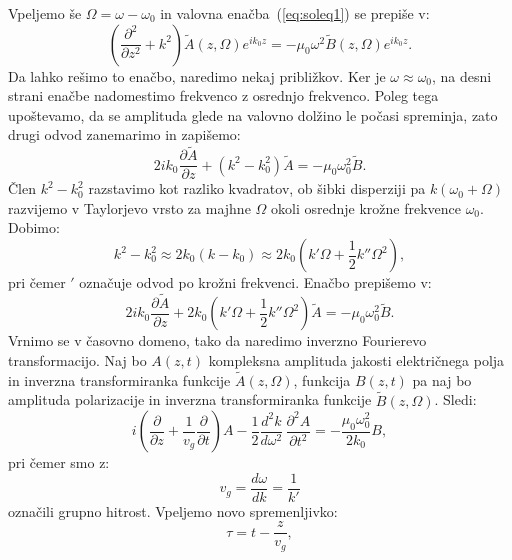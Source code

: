 Vpeljemo še 
$\Omega =\omega - \omega_0$ in valovna enačba~(\ref{eq:soleq1}) se prepiše v: 
\begin{equation}
\left(\frac{\partial^2}{\partial z^2}+k^2\right)\tilde{A}(z,\Omega) e^{ik_0z} =
- \mu_{0}\omega^2 \tilde{B} (z,\Omega) e^{ik_0z}.
\end{equation}
Da lahko rešimo to enačbo, naredimo nekaj približkov. Ker je $\omega \approx \omega_0$, na desni strani
enačbe nadomestimo frekvenco z osrednjo frekvenco. Poleg tega upoštevamo, da se amplituda 
glede na valovno dolžino le počasi spreminja, zato drugi odvod zanemarimo in zapišemo: 
\begin{equation}
2 i k_0 \frac{\partial \tilde{A}}{\partial z} + (k^2-k_0^2) \tilde{A} = - \mu_{0}\omega_0^2 \tilde{B}.
\end{equation}
Člen $k^2 - k_0^2$ razstavimo kot razliko kvadratov, ob šibki disperziji pa $k(\omega_0 + \Omega)$
razvijemo v Taylorjevo vrsto za majhne $\Omega$ 
okoli osrednje krožne frekvence $\omega_0$. Dobimo:
\begin{equation}
k^2 - k_0^2 \approx 2k_0 (k-k_0) \approx 2k_0 (k'\Omega + \frac{1}{2}k''\Omega^2),
\end{equation}
pri čemer $'$ označuje odvod po krožni frekvenci. Enačbo prepišemo v:
\begin{equation}
2 i k_0 \frac{\partial \tilde{A}}{\partial z} + 2k_0(k'\Omega + \frac{1}{2}k''\Omega^2) \tilde{A} 
= - \mu_{0}\omega_0^2 \tilde{B}.
\end{equation}
Vrnimo se v časovno domeno, tako da naredimo inverzno Fourierevo transformacijo. Naj bo 
$A(z,t)$ kompleksna amplituda jakosti električnega polja in inverzna transformiranka 
funkcije $\tilde{A}(z,\Omega)$, funkcija $B(z,t)$ pa naj bo 
amplituda polarizacije in inverzna transformiranka 
funkcije $\tilde{B}(z,\Omega)$.
Sledi:
\begin{equation}
i \left(\frac{\partial}{\partial z}+\frac{1}{v_{g}}\frac{\partial}{\partial t}\right)A-
\frac{1}{2}\frac{d^{2}k}{d\omega^{2}}\,\frac{\partial^{2}A}{\partial t^{2}}=
-\frac{\mu_0\omega_0^2}{2 k_0}B,
\label{8.93}
\end{equation}
pri čemer smo z:
\begin{equation}
 v_g = \frac{d\omega}{dk} = \frac{1}{k'}
\end{equation}
označili grupno hitrost.
Vpeljemo novo spremenljivko:
\begin{equation}
\tau=t-\frac{z}{v_{g}},
\label{nelinver}
\end{equation}

